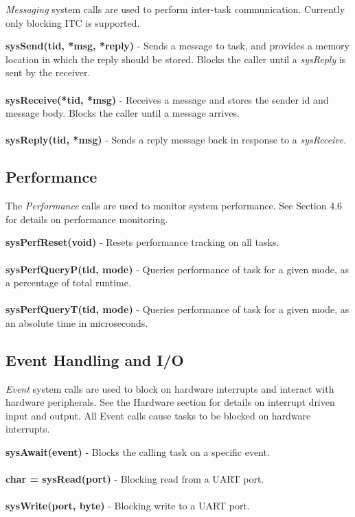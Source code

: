 \documentclass[twoside,a4paper]{refart}
\begin{document}
\textit{Messaging} system calls are used to perform inter-task communication. Currently only blocking ITC is supported.

\textbf{sysSend(tid, *msg, *reply)} - Sends a message to task, and provides a memory location in which the reply should be stored. Blocks the caller until a \textit{sysReply} is sent by the receiver.\\\\
\textbf{sysReceive(*tid, *msg)} - Receives a message and stores the sender id and message body. Blocks the caller until a message arrives.\\\\
\textbf{sysReply(tid, *msg)} - Sends a reply message back in response to a \textit{sysReceive}.

\subsection{Performance}

The \textit{Performance} calls are used to monitor system performance. See Section 4.6 for details on performance monitoring.

\textbf{sysPerfReset(void)} - Resets performance tracking on all tasks.\\\\
\textbf{sysPerfQueryP(tid, mode)} - Queries performance of task for a given mode, as a percentage of total runtime.\\\\
\textbf{sysPerfQueryT(tid, mode)} - Queries performance of task for a given mode, as an absolute time in microseconds.

\subsection{Event Handling and I/O}

\textit{Event} system calls are used to block on hardware interrupts and interact with hardware peripherals. See the Hardware section for details on interrupt driven input and output. All Event calls cause tasks to be blocked on hardware interrupts.

\textbf{sysAwait(event)} - Blocks the calling task on a specific event.\\\\
\textbf{char = sysRead(port)} - Blocking read from a UART port.\\\\
\textbf{sysWrite(port, byte)} - Blocking write to a UART port.
\end{document}

